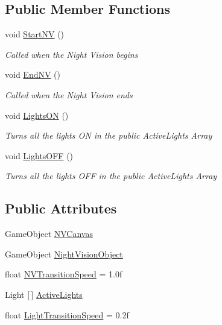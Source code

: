 \subsection*{Public Member Functions}
\begin{DoxyCompactItemize}
\item 
void \mbox{\hyperlink{class_night_vision_af4355043a822669cf20c1bc318543539}{Start\+NV}} ()
\begin{DoxyCompactList}\small\item\em Called when the Night Vision begins \end{DoxyCompactList}\item 
void \mbox{\hyperlink{class_night_vision_adbc1111e211f1759bb67b6118ee3118c}{End\+NV}} ()
\begin{DoxyCompactList}\small\item\em Called when the Night Vision ends \end{DoxyCompactList}\item 
void \mbox{\hyperlink{class_night_vision_ae34023a85285e821c06db76a48af5d18}{Lights\+ON}} ()
\begin{DoxyCompactList}\small\item\em Turns all the lights ON in the public Active\+Lights Array \end{DoxyCompactList}\item 
void \mbox{\hyperlink{class_night_vision_a5d61b9beaa4d3cb9b1d42677e6e77124}{Lights\+O\+FF}} ()
\begin{DoxyCompactList}\small\item\em Turns all the lights O\+FF in the public Active\+Lights Array \end{DoxyCompactList}\end{DoxyCompactItemize}
\subsection*{Public Attributes}
\begin{DoxyCompactItemize}
\item 
Game\+Object \mbox{\hyperlink{class_night_vision_a87df66ec5cac946275ed12e40cd8b20a}{N\+V\+Canvas}}
\item 
Game\+Object \mbox{\hyperlink{class_night_vision_a0319e6f51ca09217bad8cad12e2f07ed}{Night\+Vision\+Object}}
\item 
float \mbox{\hyperlink{class_night_vision_af1b09dce6c363ac1db1ad09e54bcc181}{N\+V\+Transition\+Speed}} = 1.\+0f
\item 
Light \mbox{[}$\,$\mbox{]} \mbox{\hyperlink{class_night_vision_a66c2ee9ee95d47cd713ddddc3d901e53}{Active\+Lights}}
\item 
float \mbox{\hyperlink{class_night_vision_a7a289fb3043fbb063347fff73db3f9fc}{Light\+Transition\+Speed}} = 0.\+2f
\end{DoxyCompactItemize}


